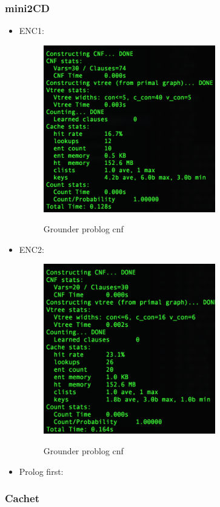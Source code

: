 \documentclass[a4paper,10pt]{report}
\begin{document}
\subsubsection*{mini2CD}

\begin{itemize}
	\item ENC1:
\begin{figure}[h!]
  \includegraphics[width=7.5cm]{minic2d-ENC1.png}
  \label{CNF}
  \caption{Grounder problog cnf}
\end{figure}
	\item ENC2:
	\begin{figure}[h!]
  \includegraphics[width=7.5cm]{minic2d-ENC2.png}
  \label{CNF}
  \caption{Grounder problog cnf}
\end{figure}

	\item Prolog first:
\end{itemize}

\subsubsection*{Cachet}
\end{document}
